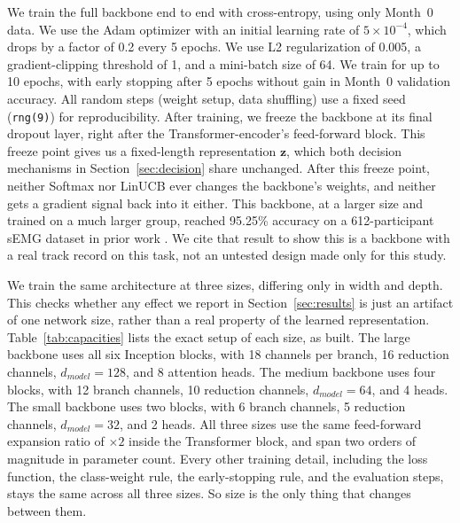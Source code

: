 \documentclass[journal]{IEEEtran}
\begin{document}
We train the full backbone end to end with cross-entropy, using only Month~0 data. We use the Adam optimizer with an initial learning rate of $5\times10^{-4}$, which drops by a factor of 0.2 every 5 epochs. We use L2 regularization of 0.005, a gradient-clipping threshold of 1, and a mini-batch size of 64. We train for up to 10 epochs, with early stopping after 5 epochs without gain in Month~0 validation accuracy. All random steps (weight setup, data shuffling) use a fixed seed (\texttt{rng(9)}) for reproducibility. After training, we freeze the backbone at its final dropout layer, right after the Transformer-encoder's feed-forward block. This freeze point gives us a fixed-length representation $\mathbf{z}$, which both decision mechanisms in Section~\ref{sec:decision} share unchanged. After this freeze point, neither Softmax nor LinUCB ever changes the backbone's weights, and neither gets a gradient signal back into it either. This backbone, at a larger size and trained on a much larger group, reached 95.25\% accuracy on a 612-participant sEMG dataset in prior work \cite{HGREncoder}. We cite that result to show this is a backbone with a real track record on this task, not an untested design made only for this study.

We train the same architecture at three sizes, differing only in width and depth. This checks whether any effect we report in Section~\ref{sec:results} is just an artifact of one network size, rather than a real property of the learned representation. Table~\ref{tab:capacities} lists the exact setup of each size, as built. The large backbone uses all six Inception blocks, with 18 channels per branch, 16 reduction channels, $d_{model}=128$, and 8 attention heads. The medium backbone uses four blocks, with 12 branch channels, 10 reduction channels, $d_{model}=64$, and 4 heads. The small backbone uses two blocks, with 6 branch channels, 5 reduction channels, $d_{model}=32$, and 2 heads. All three sizes use the same feed-forward expansion ratio of $\times2$ inside the Transformer block, and span two orders of magnitude in parameter count. Every other training detail, including the loss function, the class-weight rule, the early-stopping rule, and the evaluation steps, stays the same across all three sizes. So size is the only thing that changes between them.
\end{document}
